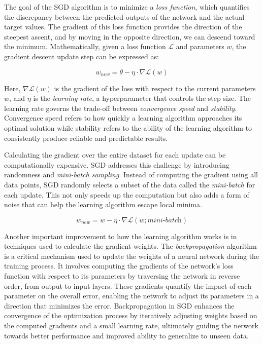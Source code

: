 The goal of the SGD algorithm is to minimize a \textit{loss function}, which quantifies the discrepancy between the predicted outputs of the network and the actual target values. The gradient of this loss function provides the direction of the steepest ascent, and by moving in the opposite direction, we can descend toward the minimum. Mathematically, given a loss function $\mathcal{L}$ and parameters $w$, the gradient descent update step can be expressed as:

\begin{equation}
    w_{new} = \theta - \eta \cdot \nabla \mathcal{L}(w)
\end{equation}

Here, $\nabla \mathcal{L}(w)$ is the gradient of the loss with respect to the current parameters $w$, and $\eta$ is the \textit{learning rate}, a hyperparameter that controls the step size. The learning rate governs the trade-off between \textit{convergence speed} and \textit{stability}. Convergence speed refers to how quickly a learning algorithm approaches its optimal solution while stability refers to the ability of the learning algorithm to consistently produce reliable and predictable results.

Calculating the gradient over the entire dataset for each update can be computationally expensive. SGD addresses this challenge by introducing randomness and \textit{mini-batch sampling}. Instead of computing the gradient using all data points, SGD randomly selects a subset of the data called the \textit{mini-batch} for each update. This not only speeds up the computation but also adds a form of noise that can help the learning algorithm escape local minima.

\begin{equation}
    w_{new} = w - \eta \cdot \nabla \mathcal{L}(w; \textit{mini-batch})
\end{equation}

Another important improvement to how the learning algorithm works is in techniques used to calculate the gradient weights. The \textit{backpropagation} algorithm is a critical mechanism used to update the weights of a neural network during the training process. It involves computing the gradients of the network's loss function with respect to its parameters by traversing the network in reverse order, from output to input layers. These gradients quantify the impact of each parameter on the overall error, enabling the network to adjust its parameters in a direction that minimizes the error. Backpropagation in SGD enhances the convergence of the optimization process by iteratively adjusting weights based on the computed gradients and a small learning rate, ultimately guiding the network towards better performance and improved ability to generalize to unseen data.

